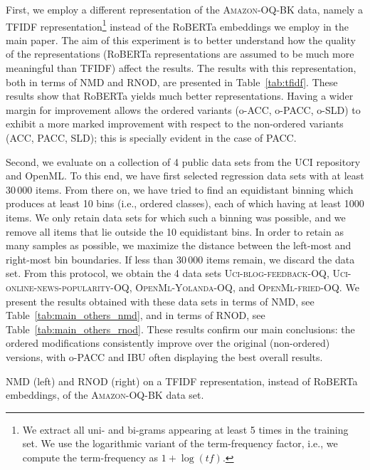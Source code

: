 \documentclass[10pt,a4paper]{article}
\begin{document}
First, we employ a different representation of the
\textsc{Amazon-OQ-BK} data, namely a TFIDF representation\footnote{We
extract all uni- and bi-grams appearing at least 5 times in the
training set. We use the logarithmic variant of the term-frequency
factor, i.e., we compute the term-frequency as $1 + \log(tf)$.}
instead of the RoBERTa embeddings we employ in the main paper. The aim
of this experiment is to better understand how the quality of the
representations (RoBERTa representations are assumed to be much more
meaningful than TFIDF) affect the results. The results with this
representation, both in terms of NMD and RNOD, are presented in
Table~\ref{tab:tfidf}.  These results show that RoBERTa yields much
better representations. Having a wider margin for improvement allows
the ordered variants (o-ACC, o-PACC, o-SLD) to exhibit a more marked
improvement with respect to the non-ordered variants (ACC, PACC, SLD);
this is specially evident in the case of PACC.

Second, we evaluate on a collection of 4 public data sets from the UCI
repository and OpenML. To this end, we have first selected regression
data sets with at least 30\,000 items. From there on, we have tried to
find an equidistant binning which produces at least 10 bins (i.e.,
ordered classes), each of which having at least 1000 items. We only
retain data sets for which such a binning was possible, and we remove
all items that lie outside the 10 equidistant bins. In order to retain
as many samples as possible, we maximize the distance between the
left-most and right-most bin boundaries. If less than 30\,000 items
remain, we discard the data set. From this protocol, we obtain the 4
data sets \textsc{Uci-blog-feedback-OQ},
\textsc{Uci-online-news-popularity-OQ}, \textsc{OpenMl-Yolanda-OQ},
and \textsc{OpenMl-fried-OQ}. We present the results obtained with
these data sets in terms of NMD, see Table~\ref{tab:main_others_nmd},
and in terms of RNOD, see Table~\ref{tab:main_others_rnod}.  These
results confirm our main conclusions: the ordered modifications
consistently improve over the original (non-ordered) versions, with
o-PACC and IBU often displaying the best overall results.

\begin{table}
  \centering
  \caption{NMD (left) and RNOD (right) on a TFIDF representation,
  instead of RoBERTa embeddings, of the \textsc{Amazon-OQ-BK} data
  set.}
  \label{tab:tfidf}
  \scriptsize
  \begin{minipage}{.49\textwidth}
    
  \end{minipage}%
  \begin{minipage}{.49\textwidth}
    
  \end{minipage}
\end{table}
\end{document}
